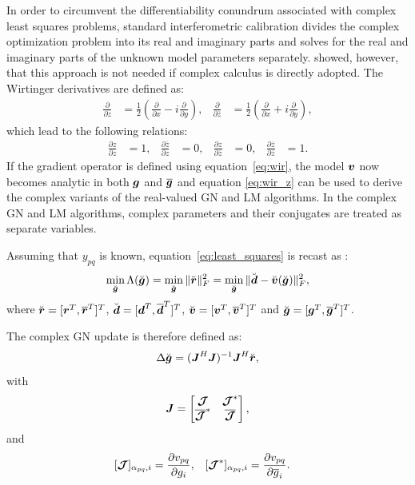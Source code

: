 \documentclass[useAMS,usenatbib]{mn2e}
\newcommand{\br}{\bmath{r}}
\newcommand{\bg}{\bmath{g}}
\newcommand{\bd}{\bmath{d}}
\newcommand{\bv}{\bmath{v}}
\newcommand{\bJ}{\bmath{J}}
\newcommand{\bmJ}{\bmath{\mathcal{J}}}
\newcommand{\conj}[1]{\overline{#1}}
\begin{document}
In order to circumvent the differentiability conundrum associated with complex least squares problems, standard interferometric calibration divides the complex optimization problem into its real and imaginary parts and solves for the real and imaginary parts of the unknown model parameters separately. \citet{Smirnov2015} showed, however, that this approach is not needed if complex calculus \citep{Wirtinger1927} is directly adopted. The Wirtinger derivatives are defined as:
\begin{align}
\label{eq:wir}
\frac{\partial}{\partial z} &= \frac{1}{2}\left ( \frac{\partial}{\partial x} -  i \frac{\partial}{\partial y} \right ),&\frac{\partial}{\partial \conj{z}} &= \frac{1}{2}\left ( \frac{\partial}{\partial x} +  i \frac{\partial}{\partial y} \right ), 
\end{align}
which lead to the following relations:
\begin{align}
\label{eq:wir_z}
\frac{\partial z}{\partial z} & = 1, & \frac{\partial \conj{z}}{\partial z}&=0, & \frac{\partial z}{\partial \conj{z}} & = 0, & \frac{\partial \conj{z}}{\partial \conj{z}}&=1.
\end{align}
If the gradient operator is defined using equation~\ref{eq:wir}, the model $\bv$ now becomes analytic in both $\bg$ and $\conj{\bg}$ and equation \ref{eq:wir_z} can be used to derive the complex variants of the real-valued GN and LM algorithms. In the complex GN and LM algorithms, complex parameters and their conjugates are treated as separate variables.

Assuming that $y_{pq}$ is known, equation~\ref{eq:least_squares} is recast as \citep{Smirnov2015}:
\begin{equation}
\label{eq:least_squares_augmented}
\min_{\breve{\bg}} \Lambda(\breve{\bg}) = \min_{\breve{\bg}} \|\breve{\br}\|_F^2 = \min_{\breve{\bg}} \|\breve{\bd} - \breve{\bv}(\breve{\bg})\|_F^2, 
\end{equation} 
where $\breve{\br} = [\br^T,\conj{\br}^T]^T$, $\breve{\bd} = [\bd^T,\conj{\bd}^T]^T$, $\breve{\bv} = [\bv^T,\conj{\bv}^T]^T$ and $\breve{\bg} = [\bg^T,\conj{\bg}^T]^T$.

The complex GN update is therefore defined as:
\begin{equation}
\label{eq:GN_update_skymodel}
 \Delta \breve{\bg} = (\bJ^H\bJ)^{-1}\bJ^H\breve{\br},
\end{equation}
with 
\begin{equation}
\label{eq:Jacobian_skymodel}
\bJ = \begin{bmatrix}
       \bmJ & \bmJ^*\\
       \conj{\bmJ}^* & \conj{\bmJ} 
      \end{bmatrix},
\end{equation}
and
\begin{align}
\label{eq:jac_entries}
[\bmJ]_{\alpha_{pq},i} &= \frac{\partial v_{pq}}{\partial g_i}, & [\bmJ^*]_{\alpha_{pq},i} &= \frac{\partial v_{pq}}{\partial \conj{g}_i}. 
\end{align}
\end{document}
